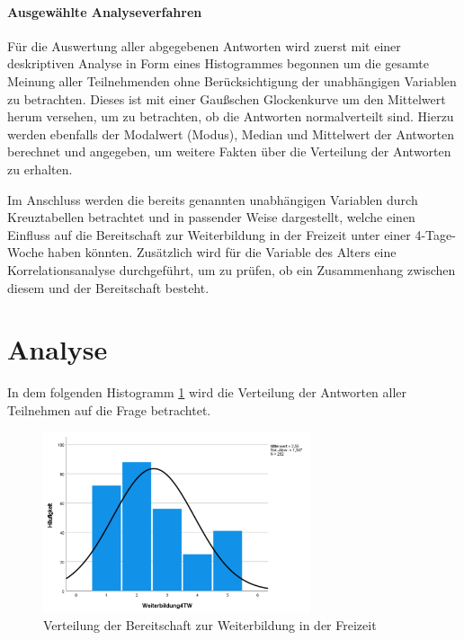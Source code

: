 \paragraph*{Ausgewählte Analyseverfahren}

Für die Auswertung aller abgegebenen Antworten wird zuerst mit einer deskriptiven Analyse in Form eines Histogrammes
begonnen um die gesamte Meinung aller Teilnehmenden ohne Berücksichtigung der unabhängigen Variablen zu betrachten. 
Dieses ist mit einer Gaußschen Glockenkurve um den Mittelwert herum versehen, um zu betrachten, ob die Antworten 
normalverteilt sind. %
Hierzu werden ebenfalls der Modalwert (Modus), Median und Mittelwert der Antworten berechnet und angegeben,
um weitere Fakten über die Verteilung der Antworten zu erhalten. %

Im Anschluss werden die bereits genannten unabhängigen Variablen durch Kreuztabellen betrachtet und
in passender Weise dargestellt, welche einen Einfluss auf die Bereitschaft zur Weiterbildung in der 
Freizeit unter einer 4-Tage-Woche haben könnten. 
Zusätzlich wird für die Variable des Alters eine Korrelationsanalyse durchgeführt, um zu prüfen, ob 
ein Zusammenhang zwischen diesem und der Bereitschaft besteht.



\section{Analyse}

In dem folgenden Histogramm \ref{fig:bereitschaft_weiterbildung_verteilung} wird die Verteilung 
der Antworten aller Teilnehmen auf die Frage  betrachtet. 

\begin{figure}[h]
    \centering
    \includegraphics[width=0.7\textwidth]{04_Artefakte/01_Abbildungen/hypothese_9/histogramm_weiterbildung.png}
    \caption{Verteilung der Bereitschaft zur Weiterbildung in der Freizeit}
    \label{fig:bereitschaft_weiterbildung_verteilung}
\end{figure}

